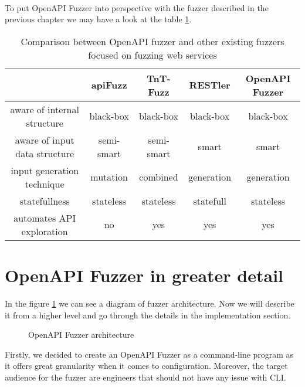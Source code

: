 \paragraph{}
To put OpenAPI Fuzzer into perspective with the fuzzer described in the previous chapter we may have a look at the table \ref{table:openapi-fuzzers-comparison}.

\begin{table}[h]
\begin{center}
\begin{tabular}{|c|c c c c|}
\hline
                              & apiFuzz    & TnT-Fuzz   & RESTler    & \textbf{OpenAPI Fuzzer} \\
\hline
aware of internal structure   & black-box  & black-box  & black-box  & black-box               \\
aware of input data structure & semi-smart & semi-smart & smart      & smart                   \\
input generation technique    & mutation   & combined   & generation & generation              \\
statefullness                 & stateless  & stateless  & statefull  & stateless               \\
automates API exploration     & no         & yes        & yes        & yes                     \\
\hline
\end{tabular}
\caption{Comparison between OpenAPI fuzzer and other existing fuzzers focused on fuzzing web services}
\label{table:openapi-fuzzers-comparison}
\end{center}
\end{table}


\section{OpenAPI Fuzzer in greater detail}
In the figure \ref{fig:fuzzer-architecture} we can see a diagram of fuzzer architecture. Now we will describe it from a higher level and go through the details in the implementation section.

\begin{figure}[h]
    \center
    \def\svgwidth{\columnwidth}
    \scalebox{0.7}{}
    \caption{OpenAPI Fuzzer architecture}
    \label{fig:fuzzer-architecture}
\end{figure}

Firstly, we decided to create an OpenAPI Fuzzer as a command-line program as it offers great granularity when it comes to configuration. Moreover, the target audience for the fuzzer are engineers that should not have any issue with CLI.

